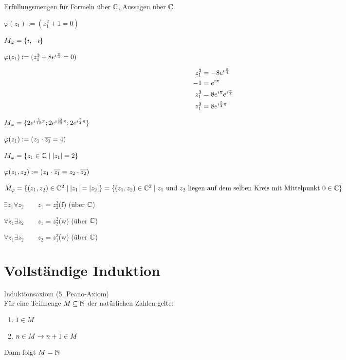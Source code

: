 \clearpage
\Bsp Erfüllungsmengen für Formeln über $\mathbb{C}$, Aussagen über $\mathbb{C}$
\begin{enumerate}
	\item $\varphi(z_1):=(z_1^2+1=0)$
	
	$M_\varphi = \{\imath,-\imath\}$
	
	\item $\varphi(z_1):=(z_1^3+8e^{\imath\frac{\pi}{4}}=0)$
	
	\begin{align*}
	z_1^3&=-8e^{\imath\frac{\pi}{4}}\\
	-1&= e^{\imath\pi}\\
	z_1^3&=8 e^{\imath\pi}e^{\imath\frac{\pi}{4}}\\
	z_1^3&=8 e^{\imath\frac{5}{4}\pi}
	\end{align*}
	
	$M_\varphi=\{2e^{\imath\frac{5}{12}\pi};2e^{\imath\frac{13}{12}\pi};2e^{\imath\frac{7}{4}\pi}\}$
	
	\item $\varphi(z_1):=(z_1\cdot \overline{z_1} = 4)$
	
	$M_\varphi=\{z_1\in\mathbb{C}\mid|z_1| = 2\}$
	
	\item $\varphi(z_1, z_2):=(z_1\cdot \overline{z_1} = z_2\cdot \overline{z_2})$
	
	$M_\varphi=\{(z_1,z_2)\in\mathbb{C}^2\mid|z_1| = |z_2|\}\\
	=\{(z_1,z_2)\in\mathbb{C}^2\mid\\ z_1\text{ und }z_2\text{ liegen auf dem selben Kreis mit Mittelpunkt }0\in\mathbb{C}\}$
	
	\begin{minipage}{\linewidth}
	\item $\exists z_1\forall z_2\qquad z_1=z_2^2$\qquad (f) (über $\mathbb{C}$)
	\item $\forall z_1\exists z_2\qquad z_1=z_2^2$\qquad (w) (über $\mathbb{C}$)
	\item $\forall z_1\exists z_2\qquad z_2=z_1^2$\qquad (w) (über $\mathbb{C}$)
	\end{minipage}
\end{enumerate}

\clearpage
\section{Vollständige Induktion}
Induktionsaxiom (5. Peano-Axiom)\\
Für eine Teilmenge $M\subseteq\mathbb{N}$ der natürlichen Zahlen gelte:\\
\begin{enumerate}
	\item $1\in M$
	\item $n\in M \rightarrow n+1\in M$
\end{enumerate}
Dann folgt $M = \mathbb{N}$

